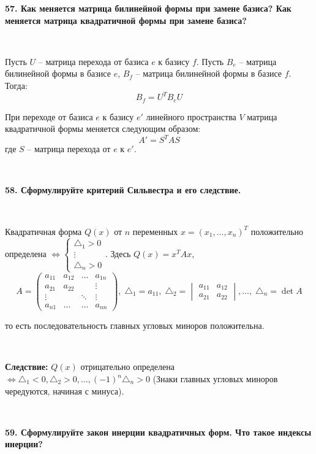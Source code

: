 \documentclass{article}
\begin{document}
	\textbf{57. Как меняется матрица билинейной формы при замене базиса? Как меняется матрица квадратичной формы при замене базиса?}
	
	{
		$\;$
		\setlength{\parindent}{0.4cm}
		\hangindent=0.4cm
		
		Пусть $U$ -- матрица перехода от базиса $e$ к базису $f$. Пусть $B_e$ -- матрица билинейной формы в базисе $e$, $B_f$ -- матрица билинейной формы в базисе $f$. Тогда: $$B_f=U^TB_eU$$
		
		При переходе от базиса $e$ к базису $e'$ линейного пространства $V$ матрица квадратичной формы меняется следующим образом: $$A'=S^TAS$$ где $S$ -- матрица перехода от $e$ к $e'$.
		
		$\;$
		\setlength{\parindent}{0cm}
		\hangindent=0cm
	}
	
	\textbf{58. Сформулируйте критерий Сильвестра и его следствие.}
	
	{
		$\;$
		\setlength{\parindent}{0.4cm}
		\hangindent=0.4cm
		
		Квадратичная форма $Q(x)$ от $n$ переменных $x=(x_1, \ldots, x_n)^T$ положительно определена $\Leftrightarrow\begin{cases}
		\triangle_1>0\\
		\vdots\\
		\triangle_n>0
		\end{cases}$. Здесь $Q(x)=x^TAx$, $$A=\begin{pmatrix}
		a_{11}&a_{12}&\ldots&a_{1n}\\
		a_{21}&a_{22}& & \vdots\\
		\vdots& &\ddots&\vdots \\
		a_{n1}&\ldots &\ldots&a_{nn}
		\end{pmatrix},	\;\triangle_1=a_{11},\; \triangle_2=\begin{vmatrix}
		a_{11}&a_{12}\\
		a_{21}&a_{22}
		\end{vmatrix}, \ldots,\; \triangle_n=\det A$$
		
		то есть последовательность главных угловых миноров положительна.
		
		$\;$
		
		\textbf{Следствие:} $Q(x)$ отрицательно определена $\Leftrightarrow\triangle_1<0, \triangle_2>0, \ldots, (-1)^n\triangle_n>0$ (Знаки главных угловых миноров чередуются, начиная с минуса).
		
		$\;$
		\setlength{\parindent}{0cm}
		\hangindent=0cm
	}
	
	\textbf{59. Сформулируйте закон инерции квадратичных форм. Что такое индексы инерции?}
	
\end{document}
